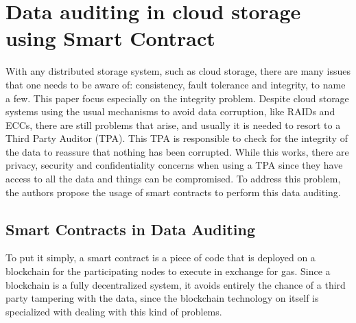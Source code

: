 \documentclass[14pt,oneside]{extreport}
\newcommand*\fpar{\hspace{1ex}}
\begin{document}
\chapter{\Large{Data auditing in cloud storage using Smart Contract \cite{paper4}}}
\vspace{-2em}
\fpar With any distributed storage system, such as cloud storage, there are many issues that one needs to be aware of: consistency, fault tolerance and integrity, to name a few. This paper focus especially on the integrity problem. Despite cloud storage systems using the usual mechanisms to avoid data corruption, like RAIDs and ECCs, there are still problems that arise, and usually it is needed to resort to a Third Party Auditor (TPA). This TPA is responsible to check for the integrity of the data to reassure that nothing has been corrupted. While this works, there are privacy, security and confidentiality concerns when using a TPA since they have access to all the data and things can be compromised. To address this problem, the authors propose the usage of smart contracts to perform this data auditing.
\section{Smart Contracts in Data Auditing}
To put it simply, a smart contract is a piece of code that is deployed on a blockchain for the participating nodes to execute in exchange for gas. Since a blockchain is a fully decentralized system, it avoids entirely the chance of a third party tampering with the data, since the blockchain technology on itself is specialized with dealing with this kind of problems.
\end{document}
